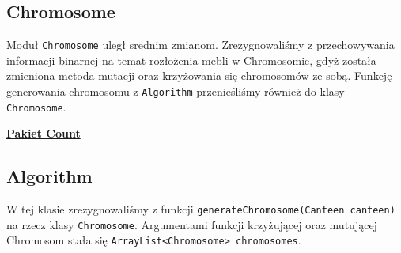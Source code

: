 \documentclass{article}
\begin{document}
\subsection{Chromosome}
\indent Moduł \verb|Chromosome| uległ srednim zmianom.
Zrezygnowaliśmy z przechowywania informacji binarnej na temat rozłożenia mebli w Chromosomie, gdyż została zmieniona metoda mutacji oraz krzyżowania się chromosomów ze sobą. Funkcję generowania chromosomu z \verb|Algorithm| przenieśliśmy również do klasy \verb|Chromosome|.
\begin{center}
\vspace{3mm}
\underline{\huge\textbf{{Pakiet Count}}}
\end{center}
\subsection{Algorithm}
\indent W tej klasie zrezygnowaliśmy z funkcji \verb|generateChromosome(Canteen canteen)| na rzecz klasy \verb|Chromosome|. Argumentami funkcji krzyżującej oraz mutującej Chromosom stała się \verb|ArrayList<Chromosome> chromosomes|.
\end{document}
